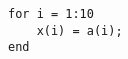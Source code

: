\documentclass{article}
\begin{document}
\begin{verbatim}
for i = 1:10
	x(i) = a(i);
end
\end{verbatim}
\end{document}
